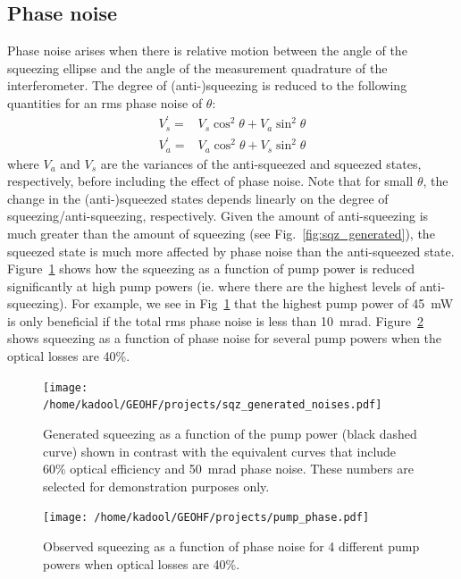 \documentclass{ligodoc}
\begin{document}
\subsection{Phase noise}
Phase noise arises when there is relative motion between the angle of
the squeezing ellipse and the angle of the measurement quadrature of
the interferometer. The degree of (anti-)squeezing is reduced to the
following quantities for an rms phase noise of $\theta$:
\begin{eqnarray}
V_s^{\prime} =& V_s \cos^2{\theta} + V_a \sin^2{\theta} \\
V_a^{\prime} =& V_a \cos^2{\theta} + V_s \sin^2{\theta} 
\end{eqnarray}
where $V_a$ and $V_s$ are the variances of the anti-squeezed and
squeezed states, respectively, before including the effect of phase
noise. Note that for small $\theta$, the change in the (anti-)squeezed
states depends linearly on the degree of squeezing/anti-squeezing,
respectively. Given the amount of anti-squeezing is much greater than
the amount of squeezing (see Fig.~\ref{fig:sqz_generated}), the
squeezed state is much more affected by phase noise than the
anti-squeezed state. Figure~\ref{fig:sqz_generated_noises} shows how
the squeezing as a function of pump power is reduced significantly at
high pump powers (ie. where there are the highest levels of
anti-squeezing). For example, we see in
Fig~\ref{fig:sqz_generated_noises} that the highest pump power of
45~mW is only beneficial if the total rms phase noise is less than
10~mrad. Figure~\ref{fig:pump_phase} shows squeezing as a function of
phase noise for several pump powers when the optical losses are 40\%.

\begin{figure}
\begin{centering}
\texttt{[image: /home/kadool/GEOHF/projects/sqz\_generated\_noises.pdf]}
\caption{Generated squeezing as a function of the pump power (black
  dashed curve) shown in contrast with the equivalent curves that
  include 60\% optical efficiency and 50~mrad phase noise. These
  numbers are selected for demonstration purposes only.}
\label{fig:sqz_generated_noises}
\end{centering}
\end{figure}

\begin{figure}
\begin{centering}
\texttt{[image: /home/kadool/GEOHF/projects/pump\_phase.pdf]}
\caption{Observed squeezing as a function of phase noise for 4
  different pump powers when optical losses are 40\%.}
\label{fig:pump_phase}
\end{centering}
\end{figure}
\end{document}

